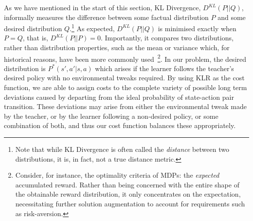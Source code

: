 As we have mentioned in the start of this section, KL Divergence,
$D^{KL}(P||Q)$, informally measures the difference between some
factual distribution $P$ and some desired distribution
$Q$.\footnote{Note that while KL Divergence is often called the
  \emph{distance} between two distributions, it is, in fact, not a
  true distance metric.}  As expected, $D^{KL}(P||Q)$ is minimised
exactly when $P=Q$, that is, $D^{KL}(P||P)=0$. Importantly, it
compares two distributions, rather than distribution properties, such
as the mean or variance which, for historical reasons, have been more commonly
used~\footnote{Consider, for instance, the optimality criteria of
  MDPs: the {\em expected} accumulated reward. Rather than being
  concerned with the entire shape of the obtainable reward
  distribution, it only concentrates on the expectation, necessitating
  further solution augmentation to account for requirements such as
  risk-aversion.}. In our problem, the desired distribution is
$P^*(s',a'|s,a)$ which arises if the learner follows the teacher's
desired policy with no environmental tweaks required.  By using KLR as
the cost function, we are able to assign costs to the complete variety
of possible long term deviations caused by departing from the ideal
probability of state-action pair transition.  These deviations may
arise from either the environmental tweak made by the teacher, or by
the learner following a non-desired policy, or some combination of
both, and thus our cost function balances these appropriately.





